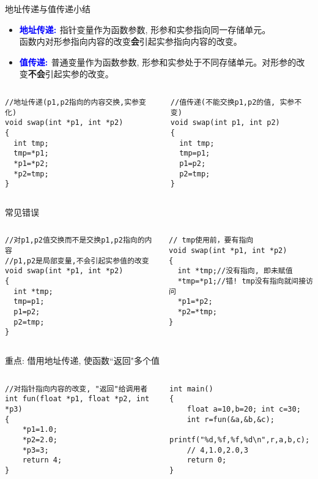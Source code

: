 \begin{frame}{地址传递与值传递小结}
\vspace{-0.2cm}
\begin{itemize}
	\item \textbf{\textcolor{blue}{地址传递: }}指针变量作为函数参数, 形参和实参指向同一存储单元。\\
	函数内对形参指向内容的改变\textbf{会}引起实参指向内容的改变。
	\item \textbf{\textcolor{blue}{值传递: }}普通变量作为函数参数, 形参和实参处于不同存储单元。对形参的改变\textbf{不会}引起实参的改变。
\end{itemize}
\vspace{-0.5cm}
\begin{columns}[T]
\begin{lstlisting}
//地址传递(p1,p2指向的内容交换,实参变化)
void swap(int *p1, int *p2)
{
  int tmp;
  tmp=*p1;
  *p1=*p2;
  *p2=tmp;
}
\end{lstlisting}
\begin{lstlisting}[frame=leftline]
//值传递(不能交换p1,p2的值, 实参不变)
void swap(int p1, int p2)
{
  int tmp;
  tmp=p1;
  p1=p2;
  p2=tmp;
}
\end{lstlisting}
\end{columns}
\medskip
\end{frame}

\begin{frame}{常见错误}
\begin{columns}[T]
\begin{lstlisting}
//对p1,p2值交换而不是交换p1,p2指向的内容 
//p1,p2是局部变量,不会引起实参值的改变
void swap(int *p1, int *p2)
{
  int *tmp;
  tmp=p1;
  p1=p2;
  p2=tmp;
}
\end{lstlisting}
\begin{lstlisting}[frame=leftline]
// tmp使用前，要有指向
void swap(int *p1, int *p2)
{
  int *tmp;//没有指向, 即未赋值
  *tmp=*p1;//错! tmp没有指向就间接访问
  *p1=*p2;
  *p2=*tmp;
}
\end{lstlisting}
\end{columns}
\medskip
\end{frame}

\begin{frame}{重点: 借用地址传递, 使函数``返回"多个值}
\begin{columns}[T]
\begin{lstlisting}
//对指针指向内容的改变, "返回"给调用者
int fun(float *p1, float *p2, int *p3)
{
	*p1=1.0;
	*p2=2.0;
	*p3=3;
	return 4;
}
\end{lstlisting}
\begin{lstlisting}[frame=leftline]
int main()
{
	float a=10,b=20; int c=30;
	int r=fun(&a,&b,&c);
	printf("%d,%f,%f,%d\n",r,a,b,c);
	// 4,1.0,2.0,3
	return 0;
}
\end{lstlisting}
\end{columns}
\medskip
\end{frame}

